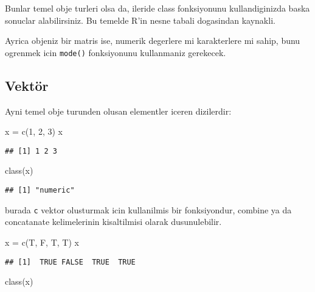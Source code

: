 \documentclass[
]{book}
\newenvironment{Shaded}{\begin{snugshade}}{\end{snugshade}}
\newcommand{\DecValTok}[1]{\textcolor[rgb]{0.00,0.00,0.81}{#1}}
\newcommand{\FunctionTok}[1]{\textcolor[rgb]{0.00,0.00,0.00}{#1}}
\newcommand{\NormalTok}[1]{#1}
\newcommand{\OtherTok}[1]{\textcolor[rgb]{0.56,0.35,0.01}{#1}}
\begin{document}
Bunlar temel obje turleri olsa da, ileride class fonksiyonunu kullandiginizda baska sonuclar alabilirsiniz. Bu temelde R'in nesne tabali dogasindan kaynakli.

Ayrica objeniz bir matris ise, numerik degerlere mi karakterlere mi sahip, bunu ogrenmek icin \texttt{mode()} fonksiyonunu kullanmaniz gerekecek.

\hypertarget{vektuxf6r}{%
\subsection{Vektör}\label{vektuxf6r}}

Ayni temel obje turunden olusan elementler iceren dizilerdir:

\begin{Shaded}
\begin{Highlighting}[]
\NormalTok{x }\OtherTok{=} \FunctionTok{c}\NormalTok{(}\DecValTok{1}\NormalTok{, }\DecValTok{2}\NormalTok{, }\DecValTok{3}\NormalTok{)}
\NormalTok{x}
\end{Highlighting}
\end{Shaded}

\begin{verbatim}
## [1] 1 2 3
\end{verbatim}

\begin{Shaded}
\begin{Highlighting}[]
\FunctionTok{class}\NormalTok{(x)}
\end{Highlighting}
\end{Shaded}

\begin{verbatim}
## [1] "numeric"
\end{verbatim}

burada \texttt{c} vektor olusturmak icin kullanilmis bir fonksiyondur, combine ya da concatanate kelimelerinin kisaltilmisi olarak dusunulebilir.

\begin{Shaded}
\begin{Highlighting}[]
\NormalTok{x }\OtherTok{=} \FunctionTok{c}\NormalTok{(T, F, T, T)}
\NormalTok{x}
\end{Highlighting}
\end{Shaded}

\begin{verbatim}
## [1]  TRUE FALSE  TRUE  TRUE
\end{verbatim}

\begin{Shaded}
\begin{Highlighting}[]
\FunctionTok{class}\NormalTok{(x)}
\end{Highlighting}
\end{Shaded}
\end{document}

